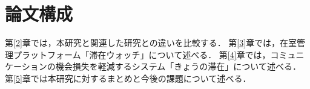 \section{論文構成}\label{1.3}
第\ref{2}章では，本研究と関連した研究との違いを比較する．
第\ref{3}章では，在室管理プラットフォーム「滞在ウォッチ」について述べる．
第\ref{4}章では，コミュニケーションの機会損失を軽減するシステム「きょうの滞在」について述べる．
第\ref{5}章では本研究に対するまとめと今後の課題について述べる．
\thispagestyle{myheadings}